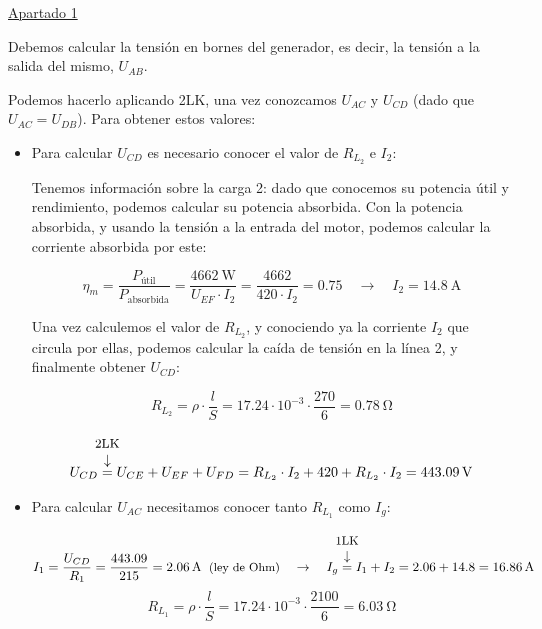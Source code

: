 \begin{example}
    
    \vspace{3mm}
    
    \underline{Apartado 1}
    
    \vspace{4mm}
    
    Debemos calcular la tensión en bornes del generador, es decir, la tensión a la salida del mismo, $U_{AB}$. 
    
    Podemos hacerlo aplicando 2LK, una vez conozcamos $U_{AC}$ y $U_{CD}$ (dado que $U_{AC} = U_{DB}$). Para obtener estos valores:
    \begin{itemize}
        \item Para calcular $U_{CD}$ es necesario conocer el valor de $R_{L_2}$ e $I_2$:
    
        Tenemos información sobre la carga 2: dado que conocemos su potencia útil y rendimiento, podemos calcular su potencia absorbida. Con la potencia absorbida, y usando la tensión a la entrada del motor, podemos calcular la corriente absorbida por este:
        
        \[
            \eta_m = \frac{P_{\textrm{útil}}}{P_{\textrm{absorbida}}} = \frac{\qty{4662}{\watt}}{U_{EF} \cdot I_2} = \frac{4662}{420\cdot I_2} = 0.75 \quad \rightarrow \quad I_2 = \qty{14.8}{\ampere}
        \]
    
        Una vez calculemos el valor de $R_{L_2}$, y conociendo ya la corriente $I_2$ que circula por ellas, podemos calcular la caída de tensión en la línea 2, y finalmente obtener $U_{CD}$:
    
        \[
            R_{L_2} = \rho \cdot \frac{l}{S} = {17.24 \cdot 10^{-3}} \cdot \frac{270}{6} = \qty{0.78}{\ohm}
        \]
        
        \vspace{-10mm}
        \[
            U_{CD} \overarrow[=][\downarrow]{\small 2LK}  U_{CE} + U_{EF} + U_{FD} = R_{L_2}\cdot I_2 + 420 + R_{L_2}\cdot I_2 = \qty{443.09}{\volt}
        \]    
    
        \item Para calcular $U_{AC}$ necesitamos conocer tanto $R_{L_1}$ como $I_g$:
    
        \vspace{-7mm}
        \[
            I_1 = \frac{U_{CD}}{R_1} = \frac{443.09}{215} = \qty{2.06}{\ampere} \;\; \text{\small (ley de Ohm)} \quad \rightarrow \quad I_g \overarrow[=][\downarrow]{\small 1LK} I_1 + I_2 = 2.06 + 14.8 = \qty{16.86}{\ampere}
        \]
        \[
            R_{L_1} = \rho \cdot \frac{l}{S} = {17.24 \cdot 10^{-3}} \cdot \frac{2100}{6} = \qty{6.03}{\ohm}
        \]
    

\end{itemize}
\end{example}
